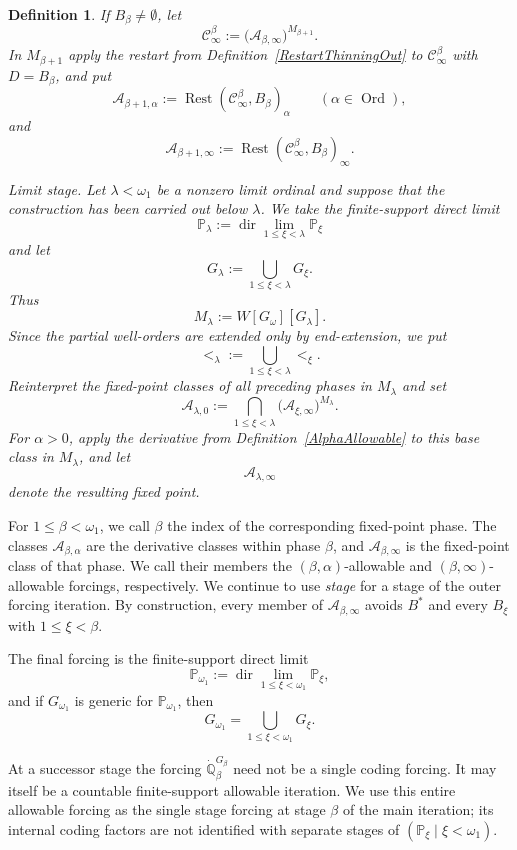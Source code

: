 \documentclass[a4paper,11pt]{article}
\newtheorem{definition}[theorem]{Definition}
\newcommand{\forceP}{\mathbb{P}}
\newcommand{\forceQ}{\mathbb{Q}}
\begin{document}
\begin{definition}
If $B_\beta\neq\emptyset$, let
\[
\mathcal C^\beta_\infty:=
\bigl(\mathcal A_{\beta,\infty}\bigr)^{M_{\beta+1}}.
\]
In $M_{\beta+1}$ apply the restart from
Definition~\ref{RestartThinningOut} to $\mathcal C^\beta_\infty$ with
$D=B_\beta$, and put
\[
\mathcal A_{\beta+1,\alpha}
:=
\operatorname{Rest}(\mathcal C^\beta_\infty,B_\beta)_\alpha
\qquad(\alpha\in\operatorname{Ord}),
\]
and
\[
\mathcal A_{\beta+1,\infty}
:=
\operatorname{Rest}(\mathcal C^\beta_\infty,B_\beta)_\infty.
\]

\smallskip
\noindent
\emph{Limit stage.}
Let $\lambda<\omega_1$ be a nonzero limit ordinal and suppose that the construction has been carried out below $\lambda$. We take the finite-support direct limit
\[
\forceP_\lambda:=\operatorname{dir}\lim_{1\leq\xi<\lambda}\forceP_\xi
\]
and let
\[
G_\lambda:=\bigcup_{1\leq\xi<\lambda}G_\xi.
\]
Thus
\[
M_\lambda:=W[G_\omega][G_\lambda].
\]
Since the partial well-orders are extended only by end-extension, we put
\[
<_\lambda:=\bigcup_{1\leq\xi<\lambda}<_\xi.
\]
Reinterpret the fixed-point classes of all preceding phases in $M_\lambda$ and set
\[
\mathcal A_{\lambda,0}:=
\bigcap_{1\leq\xi<\lambda}
\bigl(\mathcal A_{\xi,\infty}\bigr)^{M_\lambda}.
\]
For $\alpha>0$, apply the derivative from Definition~\ref{AlphaAllowable} to this base class in $M_\lambda$, and let
\[
\mathcal A_{\lambda,\infty}
\]
denote the resulting fixed point.
\end{definition}

For $1\leq\beta<\omega_1$, we call $\beta$ the index of the corresponding fixed-point phase. The classes $\mathcal A_{\beta,\alpha}$ are the derivative classes within phase $\beta$, and $\mathcal A_{\beta,\infty}$ is the fixed-point class of that phase. We call their members the $(\beta,\alpha)$-allowable and $(\beta,\infty)$-allowable forcings, respectively. We continue to use \emph{stage} for a stage of the outer forcing iteration. By construction, every member of $\mathcal A_{\beta,\infty}$ avoids $B^*$ and every $B_\xi$ with $1\leq\xi<\beta$.

The final forcing is the finite-support direct limit
\[
\forceP_{\omega_1}:=\operatorname{dir}\lim_{1\leq\xi<\omega_1}\forceP_\xi,
\]
and if $G_{\omega_1}$ is generic for $\forceP_{\omega_1}$, then
\[
G_{\omega_1}=\bigcup_{1\leq\xi<\omega_1}G_\xi.
\]

At a successor stage the forcing $\dot{\forceQ}_\beta^{G_\beta}$ need not be a single coding forcing. It may itself be a countable finite-support allowable iteration. We use this entire allowable forcing as the single stage forcing at stage $\beta$ of the main iteration; its internal coding factors are not identified with separate stages of $(\forceP_\xi\mid\xi<\omega_1)$.
\end{document}
